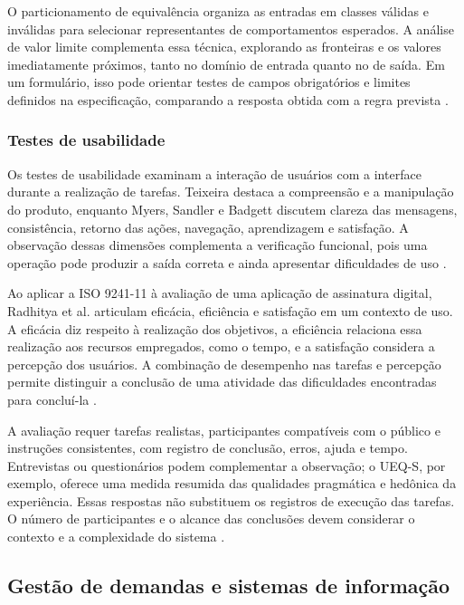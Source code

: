 O particionamento de equivalência organiza as entradas em classes válidas e inválidas para selecionar representantes de comportamentos esperados. A análise de valor limite complementa essa técnica, explorando as fronteiras e os valores imediatamente próximos, tanto no domínio de entrada quanto no de saída. Em um formulário, isso pode orientar testes de campos obrigatórios e limites definidos na especificação, comparando a resposta obtida com a regra prevista \cite{MYERS_SANDLER_BADGETT_2012,PRESSMAN_MAXIM_2021}.

\subsubsection{\esp Testes de usabilidade}

Os testes de usabilidade examinam a interação de usuários com a interface durante a realização de tarefas. Teixeira destaca a compreensão e a manipulação do produto, enquanto Myers, Sandler e Badgett discutem clareza das mensagens, consistência, retorno das ações, navegação, aprendizagem e satisfação. A observação dessas dimensões complementa a verificação funcional, pois uma operação pode produzir a saída correta e ainda apresentar dificuldades de uso \cite{TEIXEIRA_2014,MYERS_SANDLER_BADGETT_2012}.

Ao aplicar a ISO 9241-11 à avaliação de uma aplicação de assinatura digital, Radhitya et al. articulam eficácia, eficiência e satisfação em um contexto de uso. A eficácia diz respeito à realização dos objetivos, a eficiência relaciona essa realização aos recursos empregados, como o tempo, e a satisfação considera a percepção dos usuários. A combinação de desempenho nas tarefas e percepção permite distinguir a conclusão de uma atividade das dificuldades encontradas para concluí-la \cite{radhitya2024}.

A avaliação requer tarefas realistas, participantes compatíveis com o público e instruções consistentes, com registro de conclusão, erros, ajuda e tempo. Entrevistas ou questionários podem complementar a observação; o UEQ-S, por exemplo, oferece uma medida resumida das qualidades pragmática e hedônica da experiência. Essas respostas não substituem os registros de execução das tarefas. O número de participantes e o alcance das conclusões devem considerar o contexto e a complexidade do sistema \cite{MYERS_SANDLER_BADGETT_2012,TEIXEIRA_2014,schrepp2017}.

\subsection{\esp Gestão de demandas e sistemas de informação}

